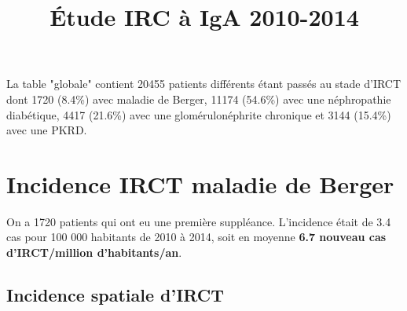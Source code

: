 \documentclass[11pt,a4paper]{article}\usepackage[]{graphicx}\usepackage[]{color}
\title{Étude IRC à IgA 2010-2014}
\begin{document}
\maketitle

\tableofcontents

\newpage








La table "globale" contient 20455 patients différents étant passés au stade d'IRCT dont 1720 (8.4\%) avec maladie de Berger, 11174 (54.6\%) avec une néphropathie diabétique, 4417 (21.6\%) avec une glomérulonéphrite chronique et 3144 (15.4\%) avec une PKRD.

\section{Incidence IRCT maladie de Berger}

On a 1720 patients qui ont eu une première suppléance. L'incidence était de 3.4 cas pour 100 000 habitants de 2010 à 2014, soit en moyenne \textbf{6.7 nouveau cas d'IRCT/million d'habitants/an}. %

  \subsection{Incidence spatiale d'IRCT}
\end{document}
